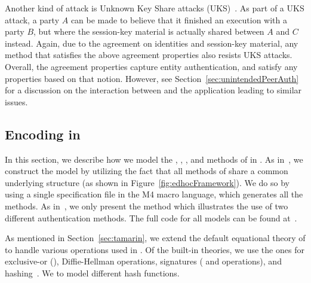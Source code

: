 \documentclass[runningheads]{llncs}
\begin{document}
Another kind of attack is Unknown Key Share attacks
(UKS)~\cite{DBLP:conf/ima/Blake-WilsonJM97}.
%
As part of a UKS attack, a party $A$ can be made to believe that it finished
an execution with a party $B$, but where the session-key material is actually
shared between $A$ and $C$ instead.
%
Again, due to the agreement on identities and session-key material, any 
method
that satisfies the above agreement properties also resists UKS attacks.
%
Overall, the agreement properties capture entity authentication,
and satisfy any properties based on that notion.
%
However, see Section~\ref{sec:unintendedPeerAuth} for a discussion on the
interaction between \mEdhoc{} and the application leading to similar issues.
%

\subsection{Encoding \mEdhoc{} in \mTamarin{}}
\label{sec:modeling}
%
In this section, we describe how we model the \mSigSig, \mSigStat, \mStatSig,
and \mStatStat{} methods of \mEdhoc{} in \mTamarin.
%
As in~\cite{Norr21}, we construct the \mTamarin{} model by utilizing the fact
that all methods of \mEdhoc{} share a common underlying structure
(as shown in Figure~\ref{fig:edhocFramework}).
%
We do so by using a single specification file in the M4 macro language,
which generates all the methods.
%
As in~\cite{Norr21}, we only present the \mStatSig{} method which illustrates
the use of two different authentication methods.
%
The full \mTamarin{} code for all models can be found 
at~\cite{edhocTamarinRepo}.
%

As mentioned in Section~\ref{sec:tamarin}, we extend the default
equational theory of \mTamarin{} to handle various operations used in 
\mEdhoc.
%
Of the built-in theories, we use the ones for exclusive-or (\mXor),
Diffie-Hellman operations, signatures ( and  operations),
and 
hashing~\cite{DBLP:conf/csfw/DreierHRS18,DBLP:conf/csfw/SchmidtMCB12}.
%
We 
to
model different hash functions.
%
\end{document}
